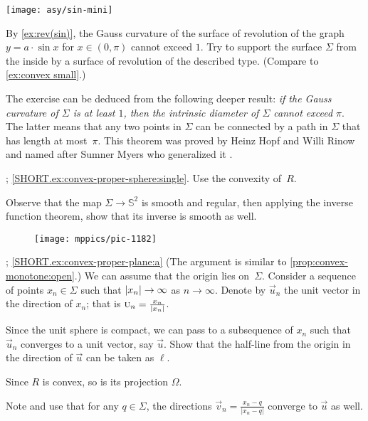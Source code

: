 \begin{multicols}{2}
\begin{Figure}
\vskip-0mm
\centering
\texttt{[image: asy/sin-mini]}
\vskip-0mm
\end{Figure}

By \ref{ex:rev(sin)}, the Gauss curvature of the surface of revolution of the graph $y=a\cdot \sin x$ for $x\in(0,\pi)$ cannot exceed $1$.
Try to support the surface $\Sigma$ from the inside by a surface of revolution of the described type.
(Compare to \ref{ex:convex small}.)

The exercise can be deduced from the following deeper result: \textit{if the Gauss curvature of $\Sigma$ is at least $1$,
then
the intrinsic diameter of $\Sigma$ cannot exceed $\pi$}.
The latter means that any two points in $\Sigma$ can be connected by a path in $\Sigma$ that has length at most~$\pi$.
This theorem was proved by Heinz Hopf and Willi Rinow \cite{hopf-rinow} and 
named after Sumner Myers who generalized it \cite{myers}.


\parbf{\ref{ex:convex-proper-sphere}}; \ref{SHORT.ex:convex-proper-sphere:single}.
Use the convexity of~$R$.

Observe that the map $\Sigma\to\mathbb{S}^2$ is smooth and regular, then applying the inverse function theorem, show that its inverse is smooth as well.

\begin{wrapfigure}{r}{29 mm}
\vskip-4mm
\centering
\texttt{[image: mppics/pic-1182]}
\vskip-3mm
\end{wrapfigure}

\parbf{\ref{ex:convex-proper-plane}}; \ref{SHORT.ex:convex-proper-plane:a}
(The argument is similar to \ref{prop:convex-monotone:open}.)
We can assume that the origin lies on~$\Sigma$.
Consider a sequence of points $x_n\in \Sigma$ such that $|x_n|\z\to \infty$ as $n\to \infty$.
Denote by $\vec u_n$ the unit vector in the direction of $x_n$; that is $\vec u_n\z=\tfrac{x_n}{|x_n|}$.

Since the unit sphere is compact, we can pass to a subsequence of $x_n$ such that $\vec u_n$ converges to a unit vector, say $\vec u$.
Show that the half-line from the origin in the direction of $\vec u$ can be taken as $\ell$.

Since $R$ is convex, so is its projection $\Omega$.

Note and use that for any $q\in \Sigma$, the directions $\vec v_n=\tfrac{x_n-q}{|x_n-q|}$ converge to $\vec u$ as well.


\end{multicols}
